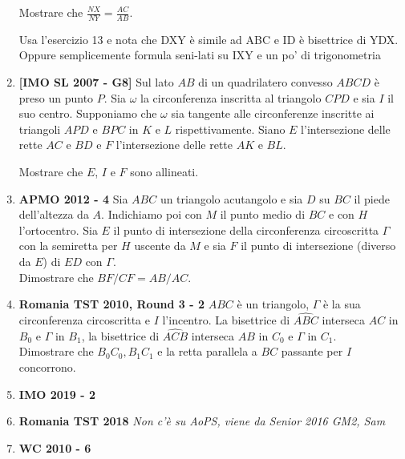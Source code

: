\begin{enumerate}
	Mostrare che $\displaystyle\frac{NX}{NY}=\displaystyle\frac{AC}{AB}$.
	
	\begin{sol}Usa l'esercizio 13 e nota che DXY è simile ad ABC e ID è bisettrice di YDX. Oppure semplicemente formula seni-lati su IXY e un po' di trigonometria
	\end{sol}
	
	\item \textbf{[IMO SL 2007 - G8]}
	Sul lato $AB$ di un quadrilatero convesso $ABCD$ è preso un punto $P$. Sia $\omega$ la circonferenza inscritta al triangolo $CPD$ e sia $I$ il suo centro. Supponiamo che $\omega$ sia tangente alle circonferenze inscritte ai triangoli $APD$ e $BPC$ in $K$ e $L$ rispettivamente. Siano $E$ l'intersezione delle rette $AC$ e $BD$ e $F$ l'intersezione delle rette $AK$ e $BL$.
	
	Mostrare che $E$, $I$ e $F$ sono allineati.
	
	\item \textbf{APMO 2012 - 4} Sia $ ABC $ un triangolo acutangolo e sia $ D $ su $BC$ il piede dell'altezza da $ A $. Indichiamo poi con $M$ il punto medio di $BC$ e con $H$ l'ortocentro. Sia $E$ il punto di intersezione della circonferenza circoscritta $\Gamma$ con la semiretta per $H$ uscente da $M$ e sia $F$ il punto di intersezione (diverso da $E$) di $ED$ con $\Gamma$.\\
	Dimostrare che $BF/CF=AB/AC$.
	
	\item \textbf{Romania TST 2010, Round 3 - 2} $ABC$ è un triangolo, $\Gamma$ è la sua circonferenza circoscritta e $I$ l'incentro. La bisettrice di $\widehat{ABC}$ interseca $AC$ in $B_0$ e $\Gamma$ in $B_1$, la bisettrice di $\widehat{ACB}$ interseca $AB$ in $C_0$ e $\Gamma$ in $C_1$. \\
	Dimostrare che $B_0C_0,B_1C_1$ e la retta parallela a $BC$ passante per $I$ concorrono.
	
	\item \textbf{IMO 2019 - 2}
	\item \textbf{Romania TST 2018} \emph{Non c'è su AoPS, viene da Senior 2016 GM2, Sam}
	\item \textbf{WC 2010 - 6} 

\end{enumerate}
\clearpage

